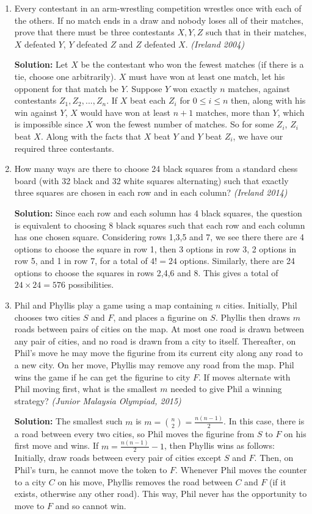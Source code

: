 \documentclass[10pt,a4paper]{article}
\begin{document}
\begin{enumerate}
\item Every contestant in an arm-wrestling competition wrestles once with each of the others. If no match ends in a draw and nobody loses all of their matches, prove that there must be three contestants $X,Y,Z$ such that in their matches, $X$ defeated $Y$, $Y$ defeated $Z$ and $Z$ defeated $X$.  
\textit{(Ireland 2004)}

\textbf{Solution:} Let $X$ be the contestant who won the fewest matches (if there is a tie, choose one arbitrarily). $X$ must have won at least one match, let his opponent for that match be $Y$. Suppose $Y$ won exactly $n$ matches, against contestants $Z_1,Z_2,...,Z_n$. If $X$ beat each $Z_i$ for $0\leq i\leq n$ then, along with his win against $Y$, $X$ would have won at least $n+1$ matches, more than $Y$, which is impossible since $X$ won the fewest number of matches. So for some $Z_i$, $Z_i$ beat $X$. Along with the facts that $X$ beat $Y$ and $Y$ beat $Z_i$, we have our required three contestants.

\item How many ways are there to choose 24 black squares from a standard chess board (with 32 black and 32 white squares alternating) such that exactly three squares are chosen in each row and in each column?
\textit{(Ireland 2014)}

\textbf{Solution:} Since each row and each solumn has 4 black squares, the question is equivalent to choosing 8 black squares such that each row and each column has one chosen square. Considering rows 1,3,5 and 7, we see there there are 4 options to choose the square in row 1, then 3 options in row 3, 2 options in row 5, and 1 in row 7, for a total of $4! = 24$ options. Similarly, there are 24 options to choose the squares in rows 2,4,6 and 8. This gives a total of $24\times24 = 576$ possibilities.

\item Phil and Phyllis play a game using a map containing $n$ cities. Initially, Phil chooses two cities $S$ and $F$, and places a figurine on $S$. Phyllis then draws $m$ roads between pairs of cities on the map. At most one road is drawn between any pair of cities, and no road is drawn from a city to itself. Thereafter, on Phil's move he may move the figurine from its current city along any road to a new city. On her move, Phyllis may remove any road from the map. Phil wins the game if he can get the figurine to city $F$. If moves alternate with Phil moving first, what is the smallest $m$ needed to give Phil a winning strategy?  
\textit{(Junior Malaysia Olympiad, 2015)}

\textbf{Solution:} The smallest such $m$ is $m=\binom{n}{2} = \frac{n(n-1)}{2}$. In this case, there is a road between every two cities, so Phil moves the figurine from $S$ to $F$ on his first move and wins. If $m = \frac{n(n-1)}{2}-1$, then Phyllis wins as follows: Initially, draw roads between every pair of cities except $S$ and $F$. Then, on Phil's turn, he cannot move the token to $F$. Whenever Phil moves the counter to a city $C$ on his move, Phyllis removes the road between $C$ and $F$ (if it exists, otherwise any other road). This way, Phil never has the opportunity to move to $F$ and so cannot win. 
\end{enumerate}
\end{document}
